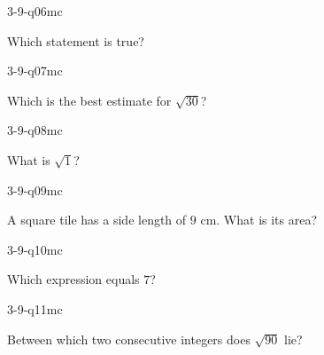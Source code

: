 \begin{practiceQuestion}{3-9-q06}{mc}
\begin{questionText}
Which statement is true?
\end{questionText}
\end{practiceQuestion}

\begin{practiceQuestion}{3-9-q07}{mc}
\begin{questionText}
Which is the best estimate for $\sqrt{30}$?
\end{questionText}
\end{practiceQuestion}

\begin{practiceQuestion}{3-9-q08}{mc}
\begin{questionText}
What is $\sqrt{1}$?
\end{questionText}
\end{practiceQuestion}

\begin{practiceQuestion}{3-9-q09}{mc}
\begin{questionText}
A square tile has a side length of $9$ cm. What is its area?
\end{questionText}
\end{practiceQuestion}

\begin{practiceQuestion}{3-9-q10}{mc}
\begin{questionText}
Which expression equals $7$?
\end{questionText}
\end{practiceQuestion}

\begin{practiceQuestion}{3-9-q11}{mc}
\begin{questionText}
Between which two consecutive integers does $\sqrt{90}$ lie?
\end{questionText}
\end{practiceQuestion}

